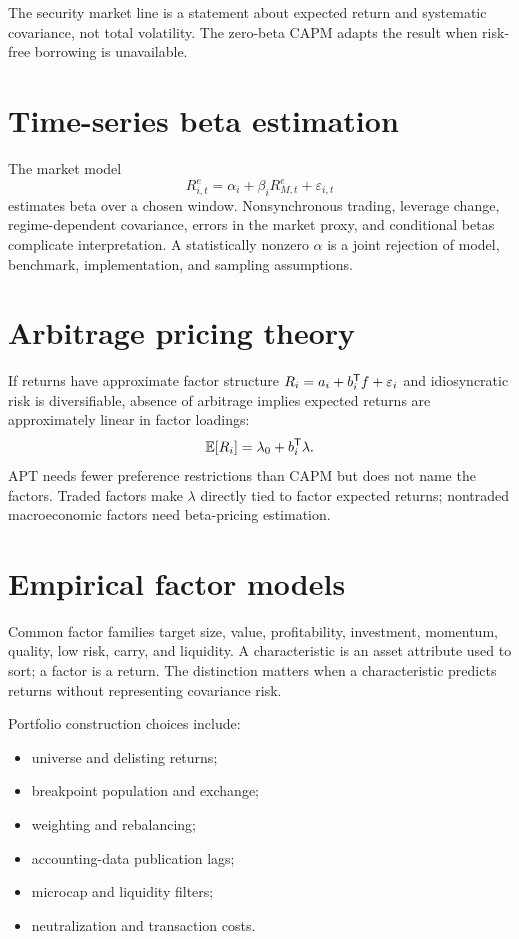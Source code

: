 The security market line is a statement about expected return and systematic
covariance, not total volatility. The zero-beta CAPM adapts the result when risk-free
borrowing is unavailable.

\section{Time-series beta estimation}

The market model
\[
R_{i,t}^e=\alpha_i+\beta_iR_{M,t}^e+\varepsilon_{i,t}
\]
estimates beta over a chosen window. Nonsynchronous trading, leverage change,
regime-dependent covariance, errors in the market proxy, and conditional betas
complicate interpretation. A statistically nonzero $\alpha$ is a joint rejection of
model, benchmark, implementation, and sampling assumptions.

\section{Arbitrage pricing theory}

If returns have approximate factor structure
$R_i=a_i+b_i^\mathsf T f+\varepsilon_i$ and idiosyncratic risk is diversifiable,
absence of arbitrage implies expected returns are approximately linear in factor
loadings:
\[
\operatorname{\mathbb E}[R_i]=\lambda_0+b_i^\mathsf T\lambda.
\]
APT needs fewer preference restrictions than CAPM but does not name the factors.
Traded factors make $\lambda$ directly tied to factor expected returns; nontraded
macroeconomic factors need beta-pricing estimation.

\section{Empirical factor models}

Common factor families target size, value, profitability, investment, momentum,
quality, low risk, carry, and liquidity. A characteristic is an asset attribute used
to sort; a factor is a return. The distinction matters when a characteristic predicts
returns without representing covariance risk.

Portfolio construction choices include:

\begin{itemize}
\item universe and delisting returns;
\item breakpoint population and exchange;
\item weighting and rebalancing;
\item accounting-data publication lags;
\item microcap and liquidity filters;
\item neutralization and transaction costs.
\end{itemize}

